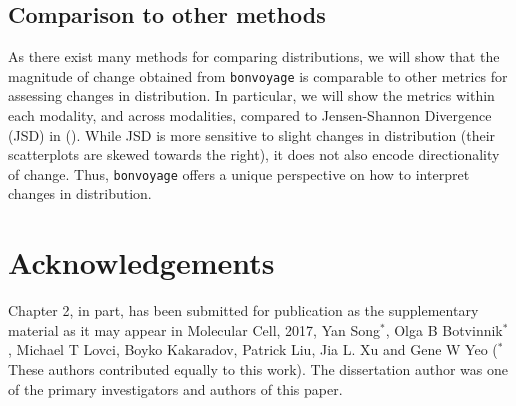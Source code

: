 \subsection{Comparison to other methods}

As there exist many methods for comparing distributions, we will show that the magnitude of change obtained from \texttt{bonvoyage} is comparable to other metrics for assessing changes in distribution. In particular, we will show the metrics within each modality, and across modalities, compared to Jensen-Shannon Divergence \cite{Cover:2011vn} (JSD) in (). While JSD is more sensitive to slight changes in distribution (their scatterplots are skewed towards the right), it does not also encode directionality of change. Thus, \texttt{bonvoyage} offers a unique perspective on how to interpret changes in distribution.

\section{Acknowledgements}

Chapter 2, in part, has been submitted for publication as the supplementary material as it may appear in Molecular Cell, 2017, Yan Song$^*$, Olga B Botvinnik$^*$, Michael T Lovci, Boyko Kakaradov, Patrick Liu, Jia L. Xu and Gene W Yeo ($^*$ These authors contributed equally to this work).  The dissertation author was one of the primary investigators and authors of this paper. 